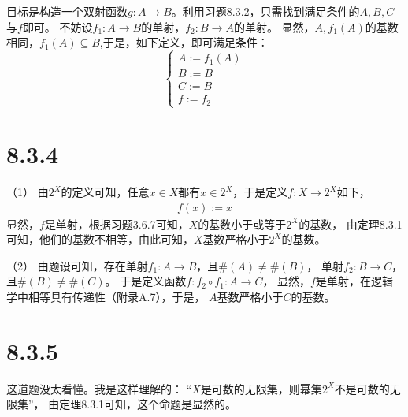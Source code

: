 \documentclass{article}
\begin{document}
目标是构造一个双射函数$g: A \rightarrow B$。利用习题8.3.2，只需找到满足条件的$A,B,C$与$f$即可。
不妨设$f_1: A \rightarrow B$的单射，$f_2: B \rightarrow A$的单射。
显然，$A,f_1(A)$的基数相同，$f_1(A) \subseteq B$,于是，如下定义，即可满足条件：
\begin{equation*}
  \begin{cases*}
    A := f_1(A) \\
    B := B      \\
    C := B      \\
    f := f_2
  \end{cases*}
\end{equation*}

\section*{8.3.4}

（1）
由$2^X$的定义可知，任意$x \in X$都有$x \in 2^X$，于是定义$f: X \rightarrow 2^X$如下，
\begin{align*}
  f(x) := x
\end{align*}
显然，$f$是单射，根据习题3.6.7可知，$X$的基数小于或等于$2^X$的基数，
由定理8.3.1可知，他们的基数不相等，由此可知，$X$基数严格小于$2^X$的基数。

（2）
由题设可知，存在单射$f_1: A \rightarrow B$，且$\#(A) \neq \#(B)$，
单射$f_2: B \rightarrow C$，且$\#(B) \neq \#(C)$。
于是定义函数$f: f_2 \circ f_1: A \rightarrow C$，
显然，$f$是单射，在逻辑学中相等具有传递性（附录A.7），于是，
$A$基数严格小于$C$的基数。

\section*{8.3.5}

\begin{zremark}
  这道题没太看懂。我是这样理解的：
  “$X$是可数的无限集，则幂集$2^X$不是可数的无限集”，
  由定理8.3.1可知，这个命题是显然的。
\end{zremark}
\end{document}
